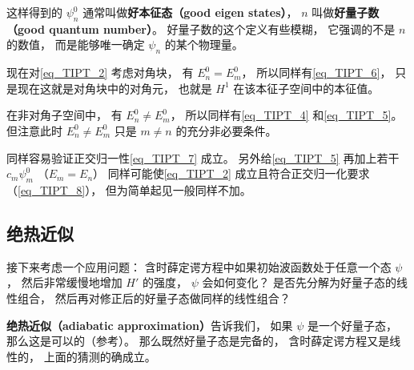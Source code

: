 这样得到的 $\psi_n^0$ 通常叫做\textbf{好本征态（good eigen states）}， $n$ 叫做\textbf{好量子数（good quantum number）}。 好量子数的这个定义有些模糊， 它强调的不是 $n$ 的数值， 而是能够唯一确定 $\psi_n$ 的某个物理量。

现在对\autoref{eq_TIPT_2} 考虑对角块， 有 $E_n^0 = E_m^0$， 所以同样有\autoref{eq_TIPT_6}， 只是现在这就是对角块中的对角元， 也就是 $H^1$ 在该本征子空间中的本征值。

在非对角子空间中， 有 $E_n^0 \ne E_m^0$， 所以同样有\autoref{eq_TIPT_4} 和\autoref{eq_TIPT_5}。 但注意此时 $E_n^0 \ne E_m^0$ 只是 $m \ne n$ 的充分非必要条件。

同样容易验证正交归一性\autoref{eq_TIPT_7} 成立。 另外给\autoref{eq_TIPT_5} 再加上若干 $c_m \psi_m^0$ （$E_m = E_n$） 同样可能使\autoref{eq_TIPT_2} 成立且符合正交归一化要求（\autoref{eq_TIPT_8}）， 但为简单起见一般同样不加。

\subsection{绝热近似}
接下来考虑一个应用问题： 含时薛定谔方程中如果初始波函数处于任意一个态 $\psi$， 然后非常缓慢地增加 $H'$ 的强度， $\psi$ 会如何变化？ 是否先分解为好量子态的线性组合， 然后再对修正后的好量子态做同样的线性组合？

\textbf{绝热近似（adiabatic approximation）}告诉我们， 如果 $\psi$ 是一个好量子态， 那么这是可以的（参考\cite{GriffQ}）。 那么既然好量子态是完备的， 含时薛定谔方程又是线性的， 上面的猜测的确成立。

